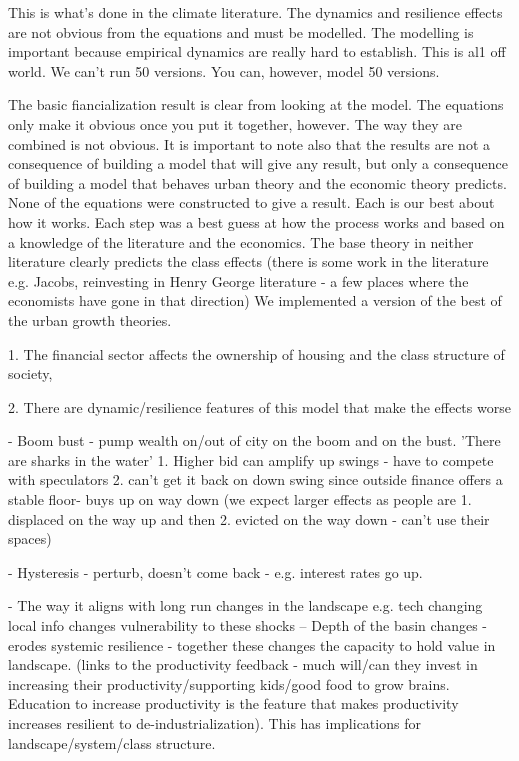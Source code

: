 This is what's done in the climate literature. The dynamics and resilience effects are not obvious from the equations and must be modelled. The modelling is important because empirical dynamics are really hard to establish. This is al1 off world. We can't run 50 versions. You can, however, model 50 versions. 

The basic fiancialization result is clear from looking at the model. The equations only make it obvious once you put it together, however. The way they are combined is not obvious.  It is important to note also that the results are not a consequence of building a model that will give any result, but only a consequence of building a model that behaves urban theory and the economic theory predicts. None of the equations were constructed to give a result. Each is our best about how it works. Each step was a best guess at how the process works and based on a knowledge of the literature and the economics. The base theory in neither literature clearly predicts the class effects (there is some work in the literature e.g. Jacobs, reinvesting in Henry George literature - a few places where the economists have gone in that direction) We implemented a version of the best of the urban growth theories.


1. The financial sector affects the ownership of housing and the class structure of society, 

2. There are dynamic/resilience features of this model that make the effects worse

- Boom bust - pump wealth on/out of city on the boom and on the bust. 'There are sharks in the water' 1. Higher bid can amplify up swings - have to compete with speculators 2. can't get it back on down swing since outside finance offers a stable floor- buys up on way down (we expect larger effects as people are 1. displaced on the way up and then 2. evicted on the way down - can't use their spaces)

- Hysteresis - perturb, doesn't come back - e.g. interest rates go up.

- The way it aligns with long run changes in the landscape e.g. tech changing local info changes vulnerability to these shocks -- Depth of the basin changes - erodes systemic resilience - together these changes the capacity to hold value in landscape. (links to the productivity feedback - much will/can they invest in increasing their productivity/supporting kids/good food to grow brains. Education to increase productivity is the feature that makes productivity increases resilient to de-industrialization). This has implications for landscape/system/class structure.

